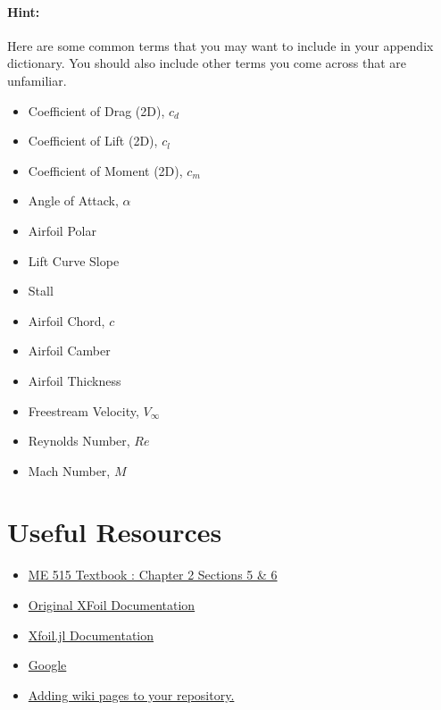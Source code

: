 \documentclass[12pt]{article}
\begin{document}
\bigskip

\paragraph{Hint:} Here are some common terms that you may want to include in your appendix dictionary. You should also include other terms you come across that are unfamiliar.

\begin{multicols}{2}
	\begin{itemize}
		\item Coefficient of Drag (2D), $c_d$
		\item Coefficient of Lift (2D), $c_l$
		\item Coefficient of Moment (2D), $c_m$
		\item Angle of Attack, $\alpha$
		\item Airfoil Polar
		\item Lift Curve Slope
		\item Stall
		\item Airfoil Chord, $c$
		\item Airfoil Camber
		\item Airfoil Thickness
		\item Freestream Velocity, $V_\infty$
		\item Reynolds Number, $Re$
		\item Mach Number, $M$
	\end{itemize}
\end{multicols}


\section{Useful Resources}
\begin{itemize}
 	\item \href{https://byu.box.com/shared/static/ywfayozbj3sr2ot6b32u8nqk5brqvurt.pdf}{ME 515 Textbook : Chapter 2 Sections 5 \& 6}
 	\item \href{http://web.mit.edu/drela/Public/web/xfoil/xfoil_doc.txt}{Original XFoil Documentation}
  	\item \href{https://flow.byu.edu/Xfoil.jl/stable/}{Xfoil.jl Documentation}
 	\item \href{https://www.google.com/}{Google}
	\item \href{https://docs.github.com/en/communities/documenting-your-project-with-wikis/adding-or-editing-wiki-pages}{Adding wiki pages to your repository.}
\end{itemize}
\end{document}
